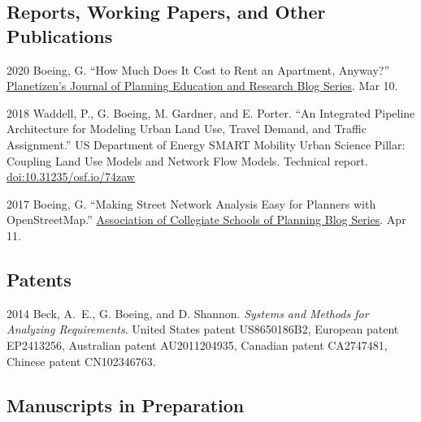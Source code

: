 \documentclass[12pt,letterpaper]{report}
\begin{document}
    \subsection*{Reports, Working Papers, and Other Publications}

    \begin{tablist}
		
		\item[2020] \tab Boeing, G. \enquote{How Much Does It Cost to Rent an Apartment, Anyway?} \href{https://www.planetizen.com/blogs/108691-how-much-does-it-cost-rent-apartment-anyway}{Planetizen's Journal of Planning Education and Research Blog Series}. Mar 10.
		
        \item[2018] \tab Waddell, P., G. Boeing, M. Gardner, and E. Porter. \enquote{An Integrated Pipeline Architecture for Modeling Urban Land Use, Travel Demand, and Traffic Assignment.} US Department of Energy SMART Mobility Urban Science Pillar: Coupling Land Use Models and Network Flow Models. Technical report. \href{https://doi.org/10.31235/osf.io/74zaw}{doi:10.31235/osf.io/74zaw}
        
        \item[2017] \tab Boeing, G. \enquote{Making Street Network Analysis Easy for Planners with OpenStreetMap.} \href{https://www.acsp.org/blogpost/1347075/272890/Making-Street-Network-Analysis-Easy-for-Planners-with-OpenStreetMap}{Association of Collegiate Schools of Planning Blog Series}. Apr 11.

    \end{tablist}



    \subsection*{Patents}

    \begin{tablist}

        \item[2014] \tab Beck, A.~E., G. Boeing, and D. Shannon. \textit{Systems and Methods for Analyzing Requirements}. United States patent US8650186B2, European patent EP2413256, Australian patent AU2011204935, Canadian patent CA2747481, Chinese patent CN102346763.

    \end{tablist}



    \subsection*{Manuscripts in Preparation}
\end{document}
